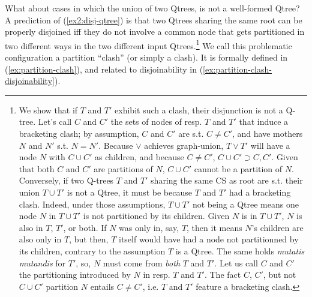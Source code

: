 
What about cases in which the union of two Qtrees, is not a well-formed Qtree? A prediction of (\ref{ex2:disj-qtree}) is that two Qtrees sharing the same root can be properly disjoined iff they do not involve a common node that gets partitioned in two different ways in the two different input Qtrees.\footnote{We show that if $T$ and $T'$ exhibit such a clash, their disjunction is not a Q-tree. Let's call $C$ and $C'$ the sets of nodes of resp. $T$ and $T'$ that induce a bracketing clash; by assumption, $C$ and $C'$ are s.t. $C\neq C'$, and have mothers $N$ and $N'$ s.t. $N=N'$. Because $\vee$ achieves graph-union, $T\vee T'$ will have a node $N$ with $C\cup C'$ as children, and because $C\neq C'$, $C\cup C' \supset C, C'$. Given that both $C$ and $C'$ are partitions of $N$, $C\cup C'$ cannot be a partition of $N$. Conversely, if two Q-trees $T$ and $T'$ sharing the same CS as root are s.t. their union $T \cup T'$ is not a Qtree, it must be because $T$ and $T'$ had a bracketing clash. Indeed, under those assumptions, $T \cup T'$ not being a Qtree means one node $N$ in $T \cup T'$ is not partitioned by its children. Given $N$ is in $T \cup T'$, $N$ is also in $T$, $T'$, or both. If $N$ was only in, say, $T$, then it means $N$'s children are also only in $T$, but then, $T$ itself would have had a node not partitionned by its children, contrary to the assumption $T$ is a Qtree. The same holds \textit{mutatis mutandis} for $T'$, so, $N$ must come from \textit{both} $T$ and $T'$. Let us call $C$ and $C'$ the partitioning introduced by $N$ in resp. $T$ and $T'$. The fact $C$, $C'$, but not $C \cup C'$ partition $N$ entails $C\neq C'$, i.e. $T$ and $T'$ feature a bracketing clash.} We call this problematic configuration a partition ``clash'' (or simply a clash). It is formally defined in (\ref{ex:partition-clash}), and related to disjoinability in (\ref{ex:partition-clash-disjoinability}).

\begin{exe}
	\label{ex:partition-clash}
	\label{ex:partition-clash-disjoinability}
\end{exe}

